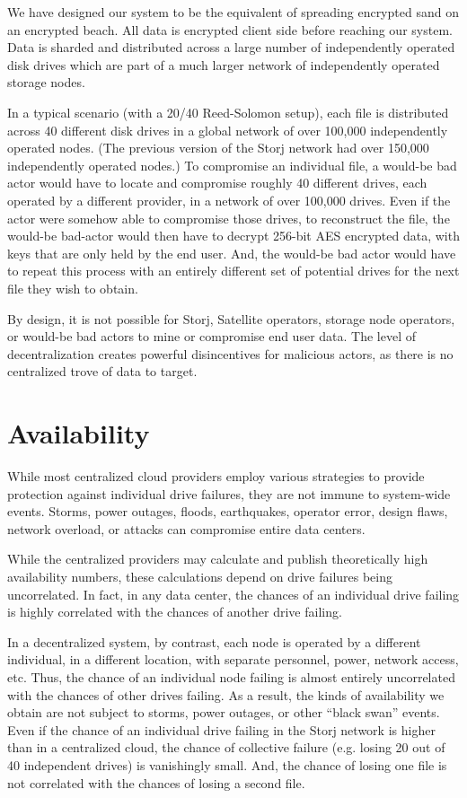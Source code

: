 \documentclass[8pt,fleqn,openany]{book}
\begin{document}
We have designed our system to be the equivalent of spreading encrypted sand
on an encrypted beach. All data is encrypted client side before reaching our
system. Data is sharded and distributed across a large number of independently
operated disk drives which are part of a much larger network of independently
operated storage nodes.

In a typical scenario (with a 20/40 Reed-Solomon
setup), each file is distributed across 40 different disk drives in a global
network of over 100,000 independently operated nodes. (The previous version of
the Storj network had over 150,000 independently operated nodes.) To compromise
an individual file, a would-be bad actor would have to locate and compromise
roughly 40 different drives, each operated by a different provider, in a
network of over 100,000 drives. Even if the actor were somehow able to
compromise those drives, to reconstruct the file, the would-be bad-actor would
then have to decrypt 256-bit AES encrypted data, with keys that are only held
by the end user. And, the would-be bad actor would have to repeat this process
with an entirely different set of potential drives for the next file they wish
to obtain.

By design, it is not possible for Storj, Satellite operators,
storage node operators, or would-be bad actors to mine or compromise end user
data. The level of decentralization creates powerful disincentives for
malicious actors, as there is no centralized trove of data to target.

\section{Availability}

While most centralized cloud providers employ various strategies to provide
protection against individual drive failures, they are not immune to
system-wide events. Storms, power outages, floods, earthquakes, operator error,
design flaws, network overload, or attacks can compromise entire data centers.

While the centralized providers may calculate and publish theoretically high
availability numbers, these calculations depend on drive failures being
uncorrelated. In fact, in any data center, the chances of an individual drive
failing is highly correlated with the chances of another drive failing.

In a decentralized system, by contrast, each node is operated by a different
individual, in a different location, with separate personnel, power, network
access, etc. Thus, the chance of an individual node failing is almost entirely
uncorrelated with the chances of other drives failing. As a result, the kinds
of availability we obtain are not subject to storms, power outages, or other
``black swan'' events. Even if the chance of an individual drive failing in the
Storj network is higher than in a centralized cloud, the chance of collective
failure (e.g. losing 20 out of 40 independent drives) is vanishingly small.
And, the chance of losing one file is not correlated with the chances of
losing a second file.
\end{document}
